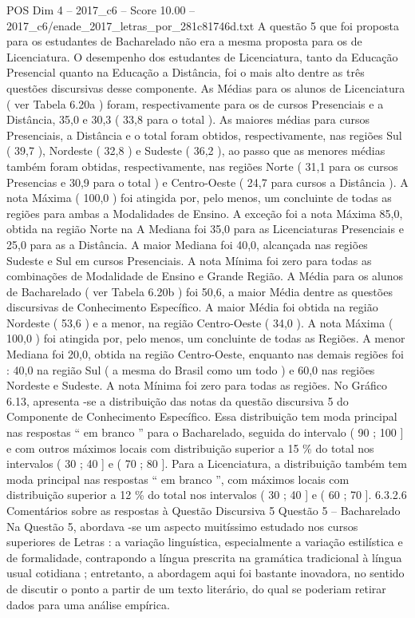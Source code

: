 \begin{textsample}{POS Dim 4 – 2017\_c6 – Score 10.00 – 2017\_c6/enade\_2017\_letras\_por\_281c81746d.txt}
A questão 5 que foi proposta para os estudantes de Bacharelado não era a mesma proposta para os de Licenciatura.
O desempenho dos estudantes de Licenciatura, tanto da Educação Presencial quanto na Educação a Distância, foi o mais alto dentre as três questões discursivas desse componente.
As Médias para os alunos de Licenciatura ( ver Tabela 6.20a ) foram, respectivamente para os de cursos Presenciais e a Distância, 35,0 e 30,3 ( 33,8 para o total ).
As maiores médias para cursos Presenciais, a Distância e o total foram obtidos, respectivamente, nas regiões Sul ( 39,7 ), Nordeste ( 32,8 ) e Sudeste ( 36,2 ), ao passo que as menores médias também foram obtidas, respectivamente, nas regiões Norte ( 31,1 para os cursos Presencias e 30,9 para o total ) e Centro-Oeste ( 24,7 para cursos a Distância ).
A nota Máxima ( 100,0 ) foi atingida por, pelo menos, um concluinte de todas as regiões para ambas a Modalidades de Ensino.
A exceção foi a nota Máxima 85,0, obtida na região Norte na A Mediana foi 35,0 para as Licenciaturas Presenciais e 25,0 para as a Distância.
A maior Mediana foi 40,0, alcançada nas regiões Sudeste e Sul em cursos Presenciais.
A nota Mínima foi zero para todas as combinações de Modalidade de Ensino e Grande Região.
A Média para os alunos de Bacharelado ( ver Tabela 6.20b ) foi 50,6, a maior Média dentre as questões discursivas de Conhecimento Específico.
A maior Média foi obtida na região Nordeste ( 53,6 ) e a menor, na região Centro-Oeste ( 34,0 ).
A nota Máxima ( 100,0 ) foi atingida por, pelo menos, um concluinte de todas as Regiões.
A menor Mediana foi 20,0, obtida na região Centro-Oeste, enquanto nas demais regiões foi : 40,0 na região Sul ( a mesma do Brasil como um todo ) e 60,0 nas regiões Nordeste e Sudeste.
A nota Mínima foi zero para todas as regiões.
No Gráfico 6.13, apresenta -se a distribuição das notas da questão discursiva 5 do Componente de Conhecimento Específico.
Essa distribuição tem moda principal nas respostas “ em branco ” para o Bacharelado, seguida do intervalo ( 90 ; 100 ] e com outros máximos locais com distribuição superior a 15 \% do total nos intervalos ( 30 ; 40 ] e ( 70 ; 80 ].
Para a Licenciatura, a distribuição também tem moda principal nas respostas “ em branco ”, com máximos locais com distribuição superior a 12 \% do total nos intervalos ( 30 ; 40 ] e ( 60 ; 70 ]. 6.3.2.6 Comentários sobre as respostas à Questão Discursiva 5 Questão 5 – Bacharelado Na Questão 5, abordava -se um aspecto muitíssimo estudado nos cursos superiores de Letras : a variação linguística, especialmente a variação estilística e de formalidade, contrapondo a língua prescrita na gramática tradicional à língua usual cotidiana ; entretanto, a abordagem aqui foi bastante inovadora, no sentido de discutir o ponto a partir de um texto literário, do qual se poderiam retirar dados para uma análise empírica.

\end{textsample}
